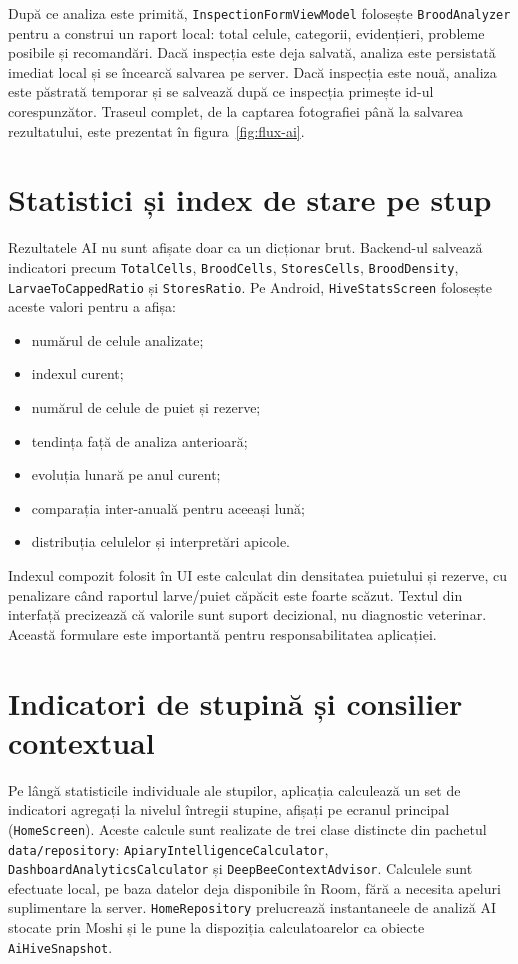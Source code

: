 După ce analiza este primită, \texttt{InspectionFormViewModel} folosește \texttt{BroodAnalyzer} pentru a construi un raport local: total celule, categorii, evidențieri, probleme posibile și recomandări. Dacă inspecția este deja salvată, analiza este persistată imediat local și se încearcă salvarea pe server. Dacă inspecția este nouă, analiza este păstrată temporar și se salvează după ce inspecția primește id-ul corespunzător. Traseul complet, de la captarea fotografiei până la salvarea rezultatului, este prezentat în figura~\ref{fig:flux-ai}.



\section{Statistici și index de stare pe stup}

Rezultatele AI nu sunt afișate doar ca un dicționar brut. Backend-ul salvează indicatori precum \texttt{TotalCells}, \texttt{BroodCells}, \texttt{StoresCells}, \texttt{BroodDensity}, \texttt{LarvaeToCappedRatio} și \texttt{StoresRatio}. Pe Android, \texttt{HiveStatsScreen} folosește aceste valori pentru a afișa:
\begin{itemize}
	\item numărul de celule analizate;
	\item indexul curent;
	\item numărul de celule de puiet și rezerve;
	\item tendința față de analiza anterioară;
	\item evoluția lunară pe anul curent;
	\item comparația inter-anuală pentru aceeași lună;
	\item distribuția celulelor și interpretări apicole.
\end{itemize}

Indexul compozit folosit în UI este calculat din densitatea puietului și rezerve, cu penalizare când raportul larve/puiet căpăcit este foarte scăzut. Textul din interfață precizează că valorile sunt suport decizional, nu diagnostic veterinar. Această formulare este importantă pentru responsabilitatea aplicației.

\section{Indicatori de stupină și consilier contextual}

Pe lângă statisticile individuale ale stupilor, aplicația calculează un set de indicatori agregați la nivelul întregii stupine, afișați pe ecranul principal (\texttt{HomeScreen}). Aceste calcule sunt realizate de trei clase distincte din pachetul \texttt{data/repository}: \texttt{ApiaryIntelligenceCalculator}, \texttt{DashboardAnalyticsCalculator} și \texttt{DeepBeeContextAdvisor}. Calculele sunt efectuate local, pe baza datelor deja disponibile în Room, fără a necesita apeluri suplimentare la server. \texttt{HomeRepository} prelucrează instantaneele de analiză AI stocate prin Moshi și le pune la dispoziția calculatoarelor ca obiecte \texttt{AiHiveSnapshot}.

